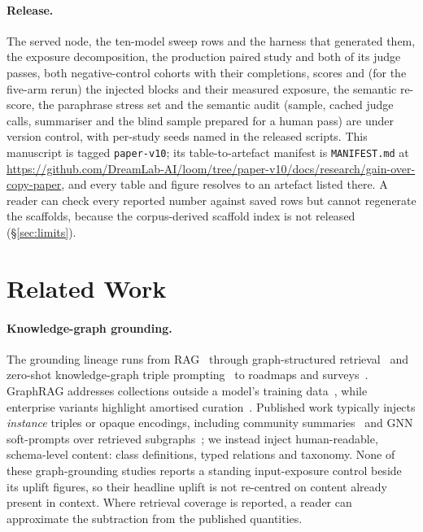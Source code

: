 \documentclass[10pt,twocolumn]{article}
\begin{document}
\paragraph{Release.} The served node, the ten-model sweep rows and the harness that generated them, the exposure decomposition, the production paired study and both of its judge passes, both negative-control cohorts with their completions, scores and (for the five-arm rerun) the injected blocks and their measured exposure, the semantic re-score, the paraphrase stress set and the semantic audit (sample, cached judge calls, summariser and the blind sample prepared for a human pass) are under version control, with per-study seeds named in the released scripts. This manuscript is tagged \texttt{paper-v10}; its table-to-artefact manifest is \texttt{MANIFEST.md} at \url{https://github.com/DreamLab-AI/loom/tree/paper-v10/docs/research/gain-over-copy-paper}, and every table and figure resolves to an artefact listed there. A reader can check every reported number against saved rows but cannot regenerate the scaffolds, because the corpus-derived scaffold index is not released (\S\ref{sec:limits}).

\section{Related Work}\label{sec:related}
\paragraph{Knowledge-graph grounding.}
The grounding lineage runs from RAG~\cite{lewis2020rag} through graph-structured retrieval~\cite{edge2024graphrag,guo2024lightrag} and zero-shot knowledge-graph triple prompting~\cite{baek2023kaping} to roadmaps and surveys~\cite{pan2024unifying,peng2024graphragsurvey}. GraphRAG addresses collections outside a model's training data~\cite{edge2024graphrag}, while enterprise variants highlight amortised curation~\cite{min2025practicalgraphrag}. Published work typically injects \emph{instance} triples or opaque encodings, including community summaries~\cite{edge2024graphrag} and GNN soft-prompts over retrieved subgraphs~\cite{he2024gretriever}; we instead inject human-readable, schema-level content: class definitions, typed relations and taxonomy. None of these graph-grounding studies reports a standing input-exposure control beside its uplift figures, so their headline uplift is not re-centred on content already present in context. Where retrieval coverage is reported, a reader can approximate the subtraction from the published quantities.
\end{document}
